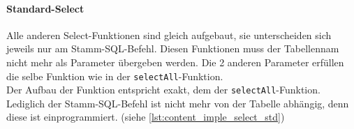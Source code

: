 

\paragraph{Standard-Select\\}
Alle anderen Select-Funktionen sind gleich aufgebaut, sie unterscheiden sich jeweils nur am Stamm-SQL-Befehl. Diesen Funktionen muss der Tabellennam nicht mehr als Parameter übergeben werden. Die 2 anderen Parameter erfüllen die selbe Funktion wie in der \texttt{selectAll}-Funktion.\\
Der Aufbau der Funktion entspricht exakt, dem der \texttt{selectAll}-Funktion. Lediglich der Stamm-SQL-Befehl ist nicht mehr von der Tabelle abhängig, denn diese ist einprogrammiert. (siehe \autoref{lst:content_imple_select_std})


%
%

%
%
%
% 
%
